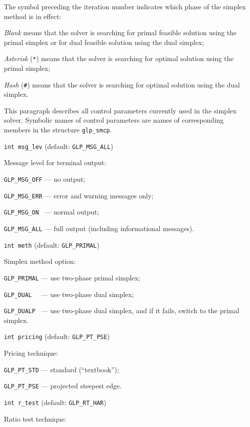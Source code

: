 The symbol preceding the iteration number indicates which phase of the
simplex method is in effect:

{\it Blank} means that the solver is searching for primal feasible
solution using the primal simplex or for dual feasible solution using
the dual simplex;

{\it Asterisk} (\verb|*|) means that the solver is searching for
optimal solution using the primal simplex;

{\it Hash} (\verb|#|) means that the solver is searching for optimal
solution using the dual simplex.

\newpage


This paragraph describes all control parameters currently used in the
simplex solver. Symbolic names of control parameters are names of
corresponding members in the structure \verb|glp_smcp|.

\bigskip

{\tt int msg\_lev} (default: {\tt GLP\_MSG\_ALL})

Message level for terminal output:

\verb|GLP_MSG_OFF| --- no output;

\verb|GLP_MSG_ERR| --- error and warning messages only;

\verb|GLP_MSG_ON | --- normal output;

\verb|GLP_MSG_ALL| --- full output (including informational messages).

\bigskip

{\tt int meth} (default: {\tt GLP\_PRIMAL})

Simplex method option:

\verb|GLP_PRIMAL| --- use two-phase primal simplex;

\verb|GLP_DUAL  | --- use two-phase dual simplex;

\verb|GLP_DUALP | --- use two-phase dual simplex, and if it fails,
switch to the primal simplex.

\bigskip

{\tt int pricing} (default: {\tt GLP\_PT\_PSE})

Pricing technique:

\verb|GLP_PT_STD| --- standard (``textbook'');

\verb|GLP_PT_PSE| --- projected steepest edge.

\bigskip

{\tt int r\_test} (default: {\tt GLP\_RT\_HAR})

Ratio test technique:


